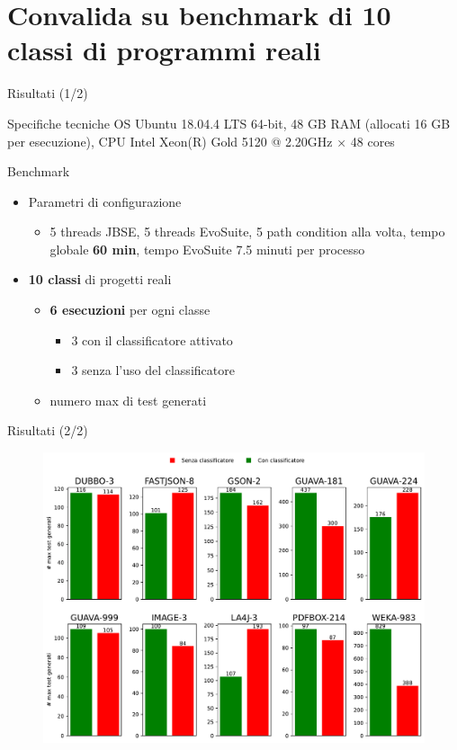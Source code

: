 \documentclass{beamer}
\begin{document}
\section{Convalida su benchmark di 10 classi di programmi reali}
\begin{frame}{Risultati (1/2)}
    \begin{block}{Specifiche tecniche}
        OS Ubuntu 18.04.4 LTS 64-bit, 48 GB RAM (allocati 16 GB per esecuzione), CPU Intel Xeon(R) Gold 5120 @ 2.20GHz × 48 cores
    \end{block}
    \begin{block}{Benchmark}
        \begin{itemize}
            \item Parametri di configurazione
            \begin{itemize}
                \item 5 threads JBSE, 5 threads EvoSuite, 5 path condition alla volta, tempo globale \textbf{60 min}, tempo EvoSuite 7.5 minuti per processo
            \end{itemize}
            \item \textbf{10 classi} di progetti reali
            \begin{itemize}
                \item \textbf{6 esecuzioni} per ogni classe
                \begin{itemize}
                    \item 3 con il classificatore attivato
                    \item 3 senza l'uso del classificatore
                \end{itemize}
                \item numero max di test generati
            \end{itemize}
        \end{itemize}
    \end{block}
\end{frame}

\begin{frame}{Risultati (2/2)}
    \begin{figure}[h]
        \centering
        \includegraphics[width=\textwidth]{img/histograms-slide.pdf}
    \end{figure}
\end{frame}
\end{document}
